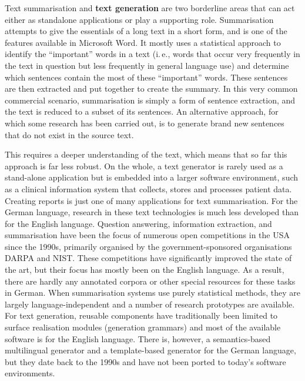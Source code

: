 \begin{multicols}{2}

Text summarisation and \textbf{text generation} are two borderline areas that can act either as standalone applications or play a supporting role. Summarisation attempts to give the essentials of a long text in a short form, and is one of the features available in Microsoft Word. It mostly uses a statistical approach to identify the “important” words in a text (i.\,e., words that occur very frequently in the text in question but less frequently in general language use) and determine which sentences contain the most of these “important” words. These sentences are then extracted and put together to create the summary. In this very common commercial scenario, summarisation is simply a form of sentence extraction, and the text is reduced to a subset of its sentences. An alternative approach, for which some research has been carried out, is to generate brand new sentences that do not exist in the source text.


This requires a deeper understanding of the text, which means that so far this approach is far less robust. On the whole, a text generator is rarely used as a stand-alone application but is embedded into a larger software environment, such as a clinical information system that collects, stores and processes patient data. Creating reports is just one of many applications for text summarisation. 
For the German language, research in these text technologies is much less developed than for the English language. Question answering, information extraction, and summarisation have been the focus of numerous open competitions in the USA since the 1990s, primarily organised by the government-sponsored organisations DARPA and NIST. These competitions have significantly improved the state of the art, but their focus has mostly been on the English language. As a result, there are hardly any annotated corpora or other special resources for these tasks in German. When summarisation systems use purely statistical methods, they are largely language-independent and a number of research prototypes are available. For text generation, reusable components have traditionally been limited to surface realisation modules (generation grammars) and most of the available software is for the English language. There is, however, a semantics-based multilingual generator and a template-based generator for the German language, but they date back to the 1990s and have not been ported to today’s software environments.


\end{multicols}
